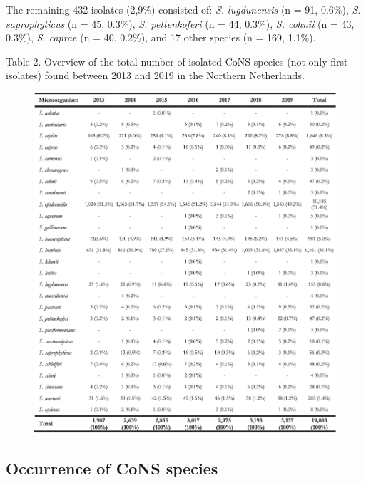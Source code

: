 \documentclass[
]{book}
\begin{document}
The remaining 432 isolates (2,9\%) consisted of: \emph{S. lugdunensis} (n = 91, 0.6\%), \emph{S. saprophyticus} (n = 45, 0.3\%), \emph{S. pettenkoferi} (n = 44, 0.3\%), \emph{S. cohnii} (n = 43, 0.3\%), \emph{S. caprae} (n = 40, 0.2\%), and 17 other species (n = 169, 1.1\%).

Table 2. Overview of the total number of isolated CoNS species (not only first isolates) found between 2013 and 2019 in the Northern Netherlands.

\begin{figure}

{\centering \includegraphics[width=1\linewidth]{images/07-t02} 

}

\end{figure}

\hypertarget{occurrence-of-cons-species}{%
\subsection{Occurrence of CoNS species}\label{occurrence-of-cons-species}}
\end{document}
